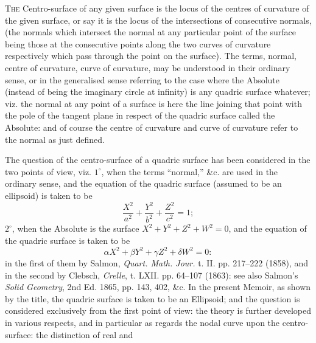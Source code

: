 \documentclass[11pt,a4paper]{article}
\begin{document}
\textsc{The} Centro-surface of any given surface is the locus of the centres of curvature of
the given surface, or say it is the locus of the intersections of consecutive normals, (the
normals which intersect the normal at any particular point of the surface being those
at the consecutive points along the two curves of curvature respectively which pass
through the point on the surface). The terms, normal, centre of curvature, curve of
curvature, may be understood in their ordinary sense, or in the generalised sense
referring to the case where the Absolute (instead of being the imaginary circle at
infinity) is any quadric surface whatever; viz. the normal at any point of a surface is
here the line joining that point with the pole of the tangent plane in respect of the
quadric surface called the Absolute: and of course the centre of curvature and curve
of curvature refer to the normal as just defined.

The question of the centro-surface of a quadric surface has been considered in the
two points of view, viz. \(1^\circ\), when the terms ``normal,'' \&c. are used in the ordinary sense,
and the equation of the quadric surface (assumed to be an ellipsoid) is taken to be
\[
\frac{X^2}{a^2}+\frac{Y^2}{b^2}+\frac{Z^2}{c^2}=1;
\]
\(2^\circ\), when the Absolute is the surface \(X^2+Y^2+Z^2+W^2=0\), and the
equation of the quadric surface is taken to be
\[
\alpha X^2+\beta Y^2+\gamma Z^2+\delta W^2=0:
\]
in the first of them by Salmon, \textit{Quart. Math. Jour.} t. II. pp. 217--222 (1858),
and in the second by Clebsch, \textit{Crelle}, t. LXII. pp. 64--107 (1863): see also
Salmon's \textit{Solid Geometry}, 2nd Ed. 1865, pp. 143, 402, \&c. In the present Memoir,
as shown by the title, the quadric surface is taken to be an Ellipsoid; and the question
is considered exclusively from the first point of view: the theory is further developed
in various respects, and in particular as regards the nodal curve upon the centro-surface:
the distinction of real and
\end{document}
